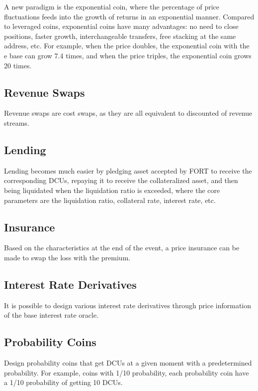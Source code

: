 \documentclass[letterpaper,12pt]{article}
\begin{document}
A new paradigm is the exponential coin, where the percentage of price fluctuations feeds into the growth of returns in an exponential manner. 
Compared to leveraged coins, exponential coins have many advantages: no need to close positions, faster growth,  interchangeable transfers, free stacking at the same address, etc. 
For example, when the price doubles, the exponential coin with the e base can grow 7.4 times, and when the price triples, the exponential coin grows 20 times.

\subsection{Revenue Swaps}

Revenue swaps are cost swaps, as they are all equivalent to discounted of revenue streams.

\subsection{Lending}

Lending becomes much easier by pledging asset accepted by FORT to receive the corresponding DCUs, repaying it to receive the collateralized asset, and then being liquidated when the liquidation ratio is exceeded, where the core parameters are the liquidation ratio, collateral rate, interest rate, etc.

\subsection{Insurance}

Based on the characteristics at the end of the event, a price insurance can be made to swap the loss with the premium.

\subsection{Interest Rate Derivatives}

It is possible to design various interest rate derivatives through price information of the base interest rate oracle.

\subsection{Probability Coins}

Design probability coins that get DCUs at a given moment with a predetermined probability. For example, coins with 1/10 probability, each probability coin have a 1/10 probability of getting 10 DCUs.
\end{document}
